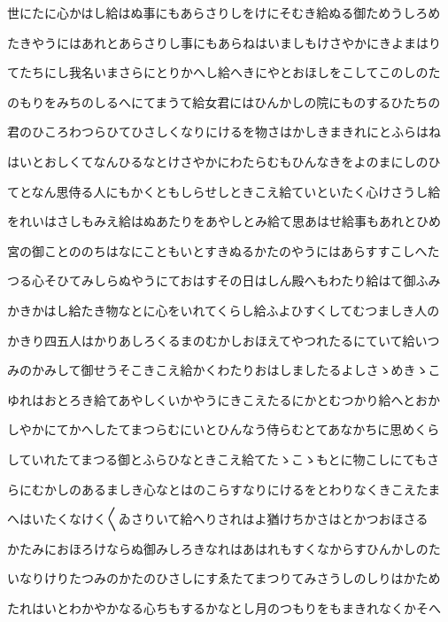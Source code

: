 \documentclass[a4paper,11pt,landscape]{ltjtarticle}
\begin{document}
\par\medskip
世にたに心かはし給はぬ事にもあらさりしをけにそむき給ぬる御ためうしろめ
\par\medskip
たきやうにはあれとあらさりし事にもあらねはいましもけさやかにきよまはり
\par\medskip
てたちにし我名いまさらにとりかへし給へきにやとおほしをこしてこのしのた
\par\medskip
のもりをみちのしるへにてまうて給女君にはひんかしの院にものするひたちの
\par\medskip
君のひころわつらひてひさしくなりにけるを物さはかしきまきれにとふらはね
\par\medskip
はいとおしくてなんひるなとけさやかにわたらむもひんなきをよのまにしのひ
\par\medskip
てとなん思侍る人にもかくともしらせしときこえ給ていといたく心けさうし給
\par\medskip
をれいはさしもみえ給はぬあたりをあやしとみ給て思あはせ給事もあれとひめ
\par\medskip
宮の御ことののちはなにこともいとすきぬるかたのやうにはあらすすこしへた
\par\medskip
つる心そひてみしらぬやうにておはすその日はしん殿へもわたり給はて御ふみ
\par\medskip
かきかはし給たき物なとに心をいれてくらし給ふよひすくしてむつましき人の
\par\medskip
かきり四五人はかりあしろくるまのむかしおほえてやつれたるにていて給いつ
\par\medskip
みのかみして御せうそこきこえ給かくわたりおはしましたるよしさゝめきゝこ
\par\medskip
ゆれはおとろき給てあやしくいかやうにきこえたるにかとむつかり給へとおか
\par\medskip
しやかにてかへしたてまつらむにいとひんなう侍らむとてあなかちに思めくら
\par\medskip
していれたてまつる御とふらひなときこえ給てたゝこゝもとに物こしにてもさ
\par\medskip
らにむかしのあるましき心なとはのこらすなりにけるをとわりなくきこえたま
\par\medskip
へはいたくなけく〱ゐさりいて給へりされはよ猶けちかさはとかつおほさる
\par\medskip
かたみにおほろけならぬ御みしろきなれはあはれもすくなからすひんかしのた
\par\medskip
いなりけりたつみのかたのひさしにすゑたてまつりてみさうしのしりはかため
\par\medskip
たれはいとわかやかなる心ちもするかなとし月のつもりをもまきれなくかそへ
\end{document}
